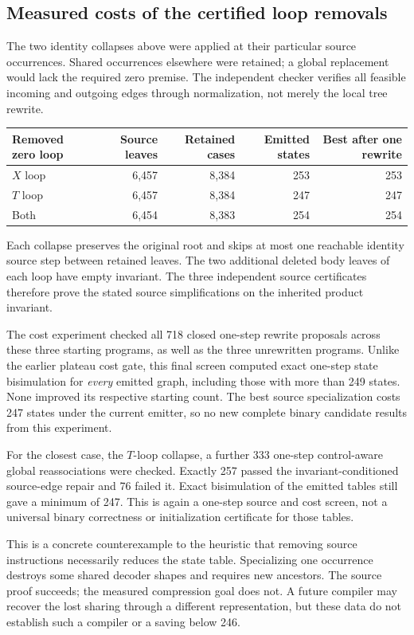 \subsection{Measured costs of the certified loop removals}

The two identity collapses above were applied at their particular
source occurrences. Shared occurrences elsewhere were retained; a
global replacement would lack the required zero premise. The independent
checker verifies all feasible incoming and outgoing edges through
normalization, not merely the local tree rewrite.

\begin{center}
\small\begin{tabular}{lrrrr}
\toprule
Removed zero loop & Source leaves & Retained cases & Emitted states & Best after one rewrite\\
\midrule
$X$ loop &6,457&8,384&253&253\\
$T$ loop &6,457&8,384&247&247\\
Both &6,454&8,383&254&254\\
\bottomrule
\end{tabular}
\end{center}

Each collapse preserves the original root and skips at most one
reachable identity source step between retained leaves. The two
additional deleted body leaves of each loop have empty invariant.
The three independent source certificates therefore prove the stated
source simplifications on the inherited product invariant.

The cost experiment checked all 718 closed one-step rewrite proposals
across these three starting programs, as well as the three unrewritten
programs. Unlike the earlier plateau cost gate, this final screen
computed exact one-step state bisimulation for \emph{every} emitted
graph, including those with more than 249 states. None improved its
respective starting count. The best source specialization costs 247
states under the current emitter, so no new complete binary candidate
results from this experiment.

For the closest case, the $T$-loop collapse, a further 333 one-step
control-aware global reassociations were checked. Exactly 257 passed
the invariant-conditioned source-edge repair and 76 failed it. Exact
bisimulation of the emitted tables still gave a minimum of 247.
This is again a one-step source and cost screen, not a universal binary
correctness or initialization certificate for those tables.

This is a concrete counterexample to the heuristic that removing
source instructions necessarily reduces the state table. Specializing
one occurrence destroys some shared decoder shapes and requires new
ancestors. The source proof succeeds; the measured compression goal
does not. A future compiler may recover the lost sharing through a
different representation, but these data do not establish such a
compiler or a saving below 246.

